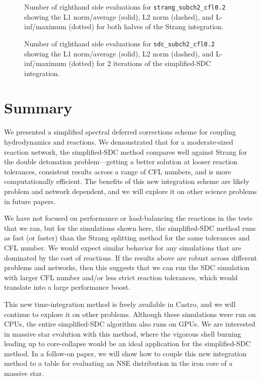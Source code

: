 \documentclass[linenumbers,trackchanges]{aastex631}
\newcommand{\castro}{{\sf Castro}}
\newcommand{\MarginPar}[1]{\marginpar{\vskip-\baselineskip\raggedright\tiny\sffamily\hrule\smallskip{\color{red}#1}\par\smallskip\hrule}}
\begin{document}
\begin{figure}[t]
\caption{\label{fig:strang_nrhs} Number of righthand side evaluations for {\tt strang\_subch2\_cfl0.2} showing the L1 norm/average (solid), L2 norm (dashed), and L-inf/maximum (dotted)
for both halves of the Strang integration.}
\end{figure}

\begin{figure}[t]
\caption{\label{fig:sdc_nrhs} Number of righthand side evaluations for {\tt sdc\_subch2\_cfl0.2} showing the L1 norm/average (solid), L2 norm (dashed), and L-inf/maximum (dotted)
for 2 iterations of the simplified-SDC integration.}
\end{figure}
\section{Summary}

We presented a simplified spectral deferred corrections scheme for coupling
hydrodynamics and reactions.  We demonstrated that for a moderate-sized reaction
network, the simplified-SDC method compares well against Strang for the double
detonation problem---getting a better solution at looser reaction tolerances,
consistent results across a range of CFL numbers, and is more computationally efficient.
The benefits of this new
integration scheme are likely problem and network dependent, and we will explore
it on other science problems in future papers.

We have not focused on performance or load-balancing the reactions in
the tests that we ran, but for the simulations shown here,
the simplified-SDC method runs as fast (or faster) than the Strang splitting method
for the same tolerances and CFL number.
We would expect similar behavior for any simulations that are
dominated by the cost of reactions.  If the results above are robust across
different problems and networks, then this suggests that we can run
the SDC simulation with larger CFL number and/or less strict reaction tolerances,
which would translate into a large performance boost.

This new time-integration method is freely available in \castro, and
we will continue to explore it on other problems.  Although these simulations
were run on CPUs, the entire simplified-SDC algorithm also runs on GPUs.
We are interested in massive star evolution with this method, where the
vigorous shell burning leading up to core-collapse would be an ideal
application for the simplified-SDC method.  In a follow-on paper, we
will show how to couple this new integration method to a table for
evaluating an NSE distribution in the iron core of a massive star.
\end{document}
